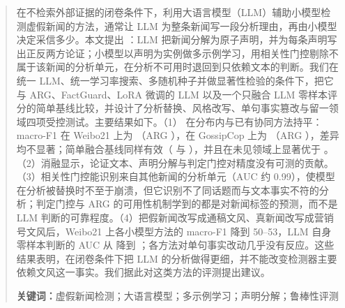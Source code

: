 \begin{abstract}
\noindent
在不检索外部证据的闭卷条件下，利用大语言模型（LLM）辅助小模型检测虚假新闻的方法，通常让 LLM 为整条新闻写一段分析理由，再由小模型决定采信多少。本文提出 \method{}：LLM 把新闻分解为原子声明，并为每条声明写出正反两方论证；小模型以声明为实例做多示例学习，用相关性门控剔除不属于该新闻的分析单元，在分析不可用时退回到只依赖文本的判断。我们在统一 LLM、统一学习率搜索、多随机种子并做显著性检验的条件下，把它与 ARG、FactGuard、LoRA 微调的 LLM 以及一个只融合 LLM 零样本评分的简单基线比较，并设计了分析替换、风格改写、单句事实篡改与留一领域四项受控测试。主要结果如下。（1）\method{} 在分布内与已有协同方法持平：macro-F1 在 Weibo21 上为 （ARG ），在 GossipCop 上为 （ARG ），差异均不显著；简单融合基线同样有效（ 与 ），并且在未见领域上显著优于 \method{}。（2）消融显示，论证文本、声明分解与判定门控对精度没有可测的贡献。（3）相关性门控能识别来自其他新闻的分析单元（AUC 约 0.99），使模型在分析被替换时不至于崩溃，但它识别不了同话题而与文本事实不符的分析；判定门控与 ARG 的可用性机制学到的都是对新闻标签的预测，而不是 LLM 判断的可靠程度。（4）把假新闻改写成通稿文风、真新闻改写成营销号文风后，Weibo21 上各小模型方法的 macro-F1 降到 50--53，LLM 自身零样本判断的 AUC 从  降到 ；各方法对单句事实改动几乎没有反应。这些结果表明，在闭卷条件下把 LLM 的分析做得更细，并不能改变检测器主要依赖文风这一事实。我们据此对这类方法的评测提出建议。

\medskip\noindent\textbf{关键词：}虚假新闻检测；大语言模型；多示例学习；声明分解；鲁棒性评测
\end{abstract}
